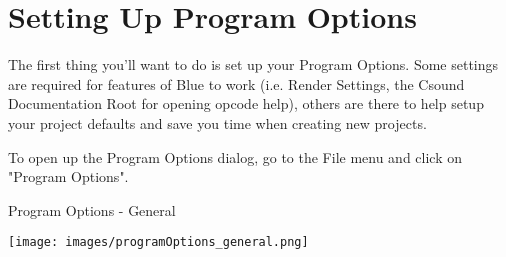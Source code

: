 \section{Setting Up Program Options}\label{programOptions}

The first thing you'll want to do is set up your Program Options. Some
settings are required for features of Blue to work (i.e. Render
Settings, the Csound Documentation Root for opening opcode help), others
are there to help setup your project defaults and save you time when
creating new projects.

To open up the Program Options dialog, go to the File menu and click on
"Program Options".

Program Options - General

\texttt{[image: images/programOptions\_general.png]}

